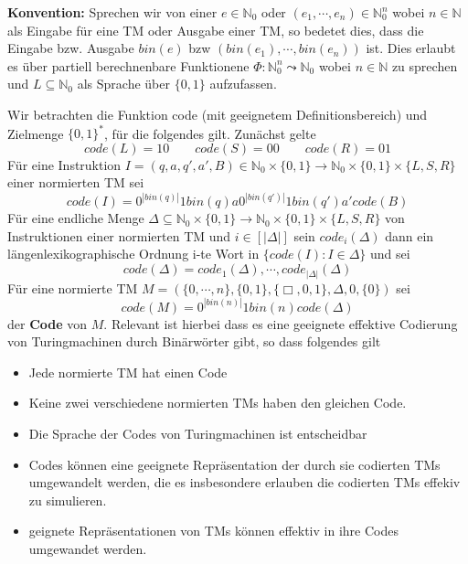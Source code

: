 \textbf{Konvention: } Sprechen wir von einer $e \in \mathbb{N}_0$ oder $(e_1, \cdots, e_n) \in \mathbb{N}_0^n$ wobei $n \in \mathbb{N}$ als Eingabe für eine TM oder Ausgabe einer TM, so bedetet dies, dass die Eingabe bzw. Ausgabe $bin(e)$ bzw $(bin(e_1), \cdots, bin(e_n))$ ist. Dies erlaubt es über partiell berechnenbare Funktionene $\Phi: \mathbb{N}_0^n \leadsto \mathbb{N}_0$ wobei $n\in \mathbb{N}$ zu sprechen und $L \subseteq \mathbb{N}_0$ als Sprache über $\{0, 1\}$ aufzufassen.

 Wir betrachten die Funktion code (mit geeignetem Definitionsbereich) und Zielmenge $\{0, 1\}^*$, für die folgendes gilt. Zunächst gelte \[code(L) = 10 \qquad code (S) = 00 \qquad code(R) = 01\] Für eine Instruktion $ I = (q, a, q', a', B) \in \mathbb{N}_0 \times \{0, 1\} \to \mathbb{N}_0 \times \{0, 1\} \times \{L, S, R\}$ einer normierten TM sei \[code (I) = 0^{|bin(q)|} 1 bin (q) a 0^{|bin(q')|} 1 bin (q') a' code (B)\] Für eine endliche Menge $ \Delta \subseteq \mathbb{N}_0 \times \{0, 1\} \to \mathbb{N}_0 \times \{0, 1\}\times \{L, S, R\}$ von Instruktionen einer normierten TM und $i \in [|\Delta|]$ sein $code_i(\Delta)$ dann ein längenlexikographische Ordnung i-te Wort in $\{code(I): I \in \Delta\}$ und sei \[ code (\Delta) = code_1(\Delta), \cdots, code_{|\Delta|}(\Delta)\] Für eine normierte TM $M = (\{0, \cdots, n\}, \{0, 1\}, \{\Box, 0, 1\}, \Delta, 0, \{0\})$ sei \[ code (M) = 0^{|bin(n)|} 1 bin (n) code (\Delta)\] der \textbf{Code} von $M$. Relevant ist hierbei dass es eine geeignete effektive Codierung von Turingmachinen durch Binärwörter gibt, so dass folgendes gilt 
\begin{itemize}
  \item Jede normierte TM hat einen Code 
  \item Keine zwei verschiedene normierten TMs haben den gleichen Code.
  \item Die Sprache der Codes von Turingmachinen ist entscheidbar
  \item Codes können eine geeignete Repräsentation der durch sie codierten TMs umgewandelt werden, die es insbesondere erlauben die codierten TMs effekiv zu simulieren.
  \item geignete Repräsentationen von TMs können effektiv in ihre Codes umgewandet werden.
\end{itemize}

